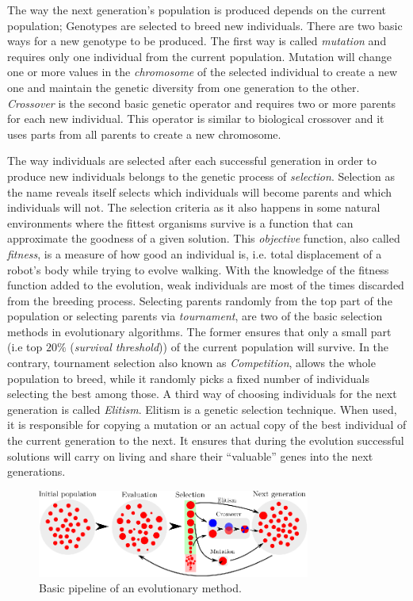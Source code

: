 The way the next generation's population is produced depends on the current population; Genotypes are selected to breed new individuals. There are two basic ways for a new genotype to be produced. The first way is called \emph{mutation} and requires only one individual from the current population. Mutation will change one or more values in the \emph{chromosome} of the selected individual to create a new one and maintain the genetic diversity from one generation to the other. \emph{Crossover} is the second basic genetic operator and requires two or more parents for each new individual. This operator is similar to biological crossover and it uses parts from all parents to create a new chromosome. 


The way individuals are selected after each successful generation in order to produce new individuals belongs to the genetic process of \emph{selection}. Selection as the name reveals itself selects which individuals will become parents and which individuals will not. The selection criteria as it also happens in some natural environments where the fittest organisms survive is a function that can approximate the goodness of a given solution. This \emph{objective} function, also called \emph{fitness}, is a measure of how good an individual is, i.e. total displacement of a robot's body while trying to evolve walking. With the knowledge of the fitness function added to the evolution, weak individuals are most of the times discarded from the breeding process. Selecting parents randomly from the top part of the population or selecting parents via \emph{tournament}, are two of the basic selection methods in evolutionary algorithms. The former ensures that only a small part (i.e top $20\%$ ({\it survival threshold})) of the current population will survive. In the contrary, tournament selection also known as \emph{Competition}, allows the whole population to breed, while it randomly picks a fixed number of individuals selecting the best among those. A third way of choosing individuals for the next generation is called \emph{Elitism}. Elitism is a genetic selection technique. When used, it is responsible for copying a mutation or an actual copy of the best individual of the current generation to the next. It ensures that during the evolution successful solutions will carry on living and share their ``valuable'' genes into the next generations.

\begin{figure}[t!]
\vspace{0.4cm} %
\centering
\includegraphics[width=0.8\textwidth]{../Figures/Misc/Evolution.eps}
\caption{Basic pipeline of an evolutionary method.}
\label{fig:evolutionPipeline}
\end{figure}


